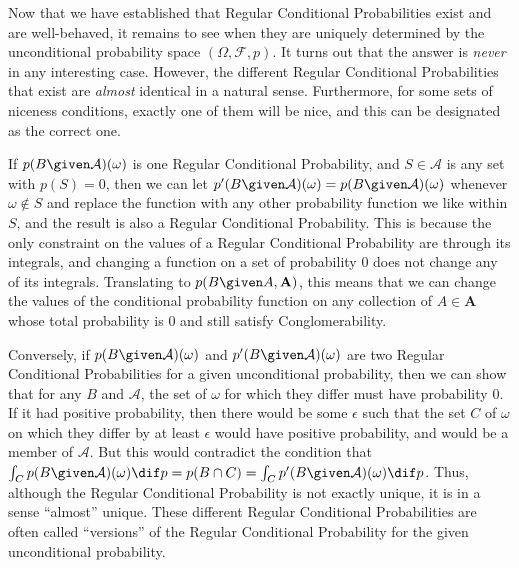 Now that we have established that Regular Conditional Probabilities exist and are well-behaved, it remains to see when they are uniquely determined by the unconditional probability space $(\Omega,\mathcal{F},p)$. It turns out that the answer is \emph{never} in any interesting case. However, the different Regular Conditional Probabilities that exist are \emph{almost} identical in a natural sense. Furthermore, for some sets of niceness conditions, exactly one of them will be nice, and this can be designated as the correct one.

If $p(B \given \mathcal{A})(\omega)$ is one Regular Conditional Probability, and $S\in\mathcal{A}$ is any set with $p(S)=0$, then we can let $p'(B \given \mathcal{A})(\omega)=p(B \given \mathcal{A})(\omega)$ whenever $\omega\not\in S$ and replace the function with any other probability function we like within $S$, and the result is also a Regular Conditional Probability. This is because the only constraint on the values of a Regular Conditional Probability are through its integrals, and changing a function on a set of probability $0$ does not change any of its integrals. Translating to $p(B \given A,\mathbf{A})$, this means that we can change the values of the conditional probability function on any collection of $A\in\mathbf{A}$ whose total probability is $0$ and still satisfy Conglomerability.

Conversely, if $p(B \given \mathcal{A})(\omega)$ and $p'(B \given \mathcal{A})(\omega)$ are two Regular Conditional Probabilities for a given unconditional probability, then we can show that for any $B$ and $\mathcal{A}$, the set of $\omega$ for which they differ must have probability $0$. If it had positive probability, then there would be some $\epsilon$ such that the set $C$ of $\omega$ on which they differ by at least $\epsilon$ would have positive probability, and would be a member of $\mathcal{A}$. But this would contradict the condition that $\int_C p(B \given \mathcal{A})(\omega) \dif p=p(B\cap C)=\int_C p'(B \given \mathcal{A})(\omega) \dif p$. Thus, although the Regular Conditional Probability is not exactly unique, it is in a sense ``almost'' unique. These different Regular Conditional Probabilities are often called ``versions'' of the Regular Conditional Probability for the given unconditional probability.


